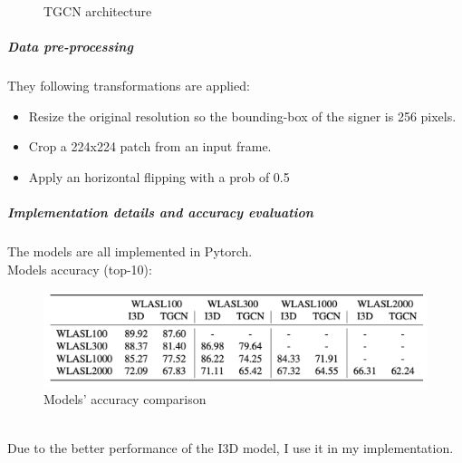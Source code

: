 \begin{itemize}
\begin{figure}[H]
\begin{center}
            \caption{TGCN architecture}
            \label{fig:introduction_tgcn}
        \end{center}
    \end{figure}
\end{itemize}

\subparagraph{Data pre-processing} They following transformations are applied:
\begin{itemize}
    \item Resize the original resolution so the bounding-box of the signer is 256 pixels.
    \item Crop a 224x224 patch from an input frame.
    \item Apply an horizontal flipping with a prob of 0.5
\end{itemize}

\subparagraph{Implementation details and accuracy evaluation} The models are all implemented in Pytorch. \\
Models accuracy (top-10): \\
\begin{figure}[!ht]
    \begin{center}
        \includegraphics[width=1.0\textwidth]{assets/models_accuracy.png}
        \caption{Models' accuracy comparison}
        \label{fig:introduction_model_accuracy_comparison}
    \end{center}
\end{figure}
\\

Due to the better performance of the I3D model, I use it in my implementation.
